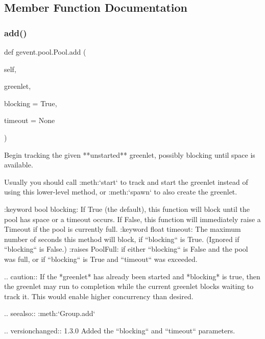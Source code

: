\subsection{Member Function Documentation}
\mbox{\label{classgevent_1_1pool_1_1_pool_a2037069f5c0d51a2b0ad368c888a7055}} 
\subsubsection{\texorpdfstring{add()}{add()}}
{\footnotesize\ttfamily def gevent.\+pool.\+Pool.\+add (\begin{DoxyParamCaption}\item[{}]{self,  }\item[{}]{greenlet,  }\item[{}]{blocking = {\ttfamily True},  }\item[{}]{timeout = {\ttfamily None} }\end{DoxyParamCaption})}

\begin{DoxyVerb}Begin tracking the given **unstarted** greenlet, possibly blocking
until space is available.

Usually you should call :meth:`start` to track and start the greenlet
instead of using this lower-level method, or :meth:`spawn` to
also create the greenlet.

:keyword bool blocking: If True (the default), this function
    will block until the pool has space or a timeout occurs.  If
    False, this function will immediately raise a Timeout if the
    pool is currently full.
:keyword float timeout: The maximum number of seconds this
    method will block, if ``blocking`` is True.  (Ignored if
    ``blocking`` is False.)
:raises PoolFull: if either ``blocking`` is False and the pool
    was full, or if ``blocking`` is True and ``timeout`` was
    exceeded.

..  caution:: If the *greenlet* has already been started and
    *blocking* is true, then the greenlet may run to completion
    while the current greenlet blocks waiting to track it. This would
    enable higher concurrency than desired.

..  seealso:: :meth:`Group.add`

..  versionchanged:: 1.3.0 Added the ``blocking`` and
    ``timeout`` parameters.
\end{DoxyVerb}
 \mbox{\label{classgevent_1_1pool_1_1_pool_a9da095e3393c66005b1db28402e377a5}} 
